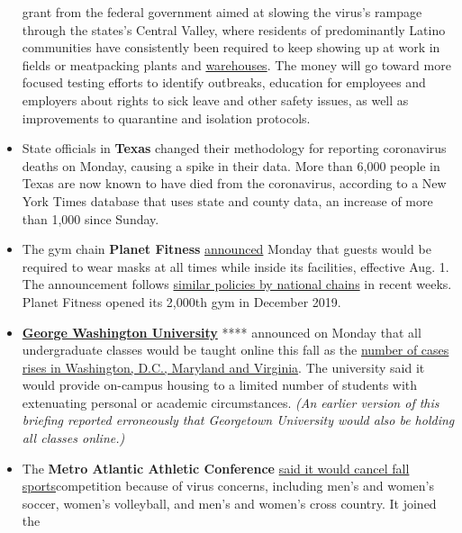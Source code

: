 \begin{itemize}
  grant from the federal government aimed at slowing the virus's rampage
  through the states's Central Valley, where residents of predominantly
  Latino communities have consistently been required to keep showing up
  at work in fields or meatpacking plants and
  \href{https://www.nytimes.com/2020/07/22/us/coronavirus-ca-warehouse-workers.html}{warehouses}.
  The money will go toward more focused testing efforts to identify
  outbreaks, education for employees and employers about rights to sick
  leave and other safety issues, as well as improvements to quarantine
  and isolation protocols.
\item
  State officials in \textbf{Texas} changed their methodology for
  reporting coronavirus deaths on Monday, causing a spike in their data.
  More than 6,000 people in Texas are now known to have died from the
  coronavirus, according to a New York Times database that uses state
  and county data, an increase of more than 1,000 since Sunday.
\item
  The gym chain \textbf{Planet Fitness}
  \href{https://www.planetfitness.com/club-cleanliness}{announced}
  Monday that guests would be required to wear masks at all times while
  inside its facilities, effective Aug. 1. The announcement follows
  \href{https://www.nytimes.com/article/which-stores-require-masks.html}{similar
  policies by national chains} in recent weeks. Planet Fitness opened
  its 2,000th gym in December 2019.
\item
  \textbf{\href{https://coronavirus.gwu.edu/}{George Washington
  University}} **** announced on Monday that all undergraduate classes
  would be taught online this fall as the
  \href{https://www.nytimes.com/interactive/2020/us/coronavirus-us-cases.html?action=click\&pgtype=Article\&state=default\&module=styln-coronavirus\&region=TOP_BANNER\&context=storylines_menu}{number
  of cases rises in Washington, D.C., Maryland and Virginia}. The
  university said it would provide on-campus housing to a limited number
  of students with extenuating personal or academic circumstances.
  \emph{(An earlier version of this briefing reported erroneously that
  Georgetown University would also be holding all classes online.)}
\item
  The \textbf{Metro Atlantic Athletic Conference}
  \href{https://maacsports.com/news/2020/7/27/general-maac-statement-of-fall-sports-competition.aspx}{said
  it would cancel fall sports}competition because of virus concerns,
  including men's and women's soccer, women's volleyball, and men's and
  women's cross country. It joined the

\end{itemize}
